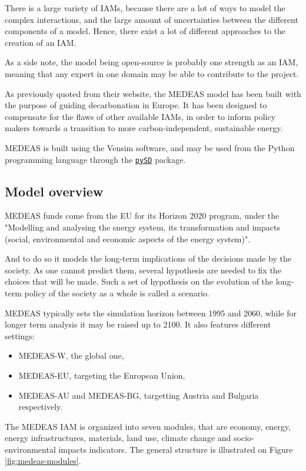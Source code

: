 There is a large variety of IAMs, because there are a lot of ways to model the complex interactions, and the large amount of uncertainties between the different components of a model. Hence, there exist a lot of different approaches to the creation of an IAM.

As a side note, the model being open-source is probably one strength as an IAM, meaning that any expert in one domain may be able to contribute to the project.

As previously quoted from their website, the MEDEAS model has been built with the purpose of guiding decarbonation in Europe. It has been designed to compensate for the flaws of other available IAMs, in order to inform policy makers towards a transition to more carbon-independent, sustainable energy.

MEDEAS is built using the Vensim software, and may be used from the Python programming language through the \href{https://pypi.org/project/pysd/}{\texttt{pySD}} package.

\subsection{Model overview}

MEDEAS funds come from the EU for its Horizon 2020 program, under the "Modelling and analysing the snergy system, its transformation and impacts (social, environmental and economic aspects of the energy system)".

And to do so it models the long-term implications of the decisions made by the society. As one cannot predict them, several hypothesis are needed to fix the choices that will be made. Such a set of hypothesis on the evolution of the long-term policy of the society as a whole is called a scenario.

MEDEAS typically sets the simulation horizon between 1995 and 2060, while for longer term analysis it may be raised up to 2100. It also features different settings:
\begin{itemize}
    \item MEDEAS-W, the global one,
    \item MEDEAS-EU, targeting the European Union,
    \item MEDEAS-AU and MEDEAS-BG, targetting Austria and Bulgaria respectively.
\end{itemize}

The MEDEAS IAM is organized into seven modules, that are economy, energy, energy infrastructures, materials, land use, climate change and socio-environmental impacts indicators. The general structure is illustrated on Figure \ref{fig:medeas-modules}.

